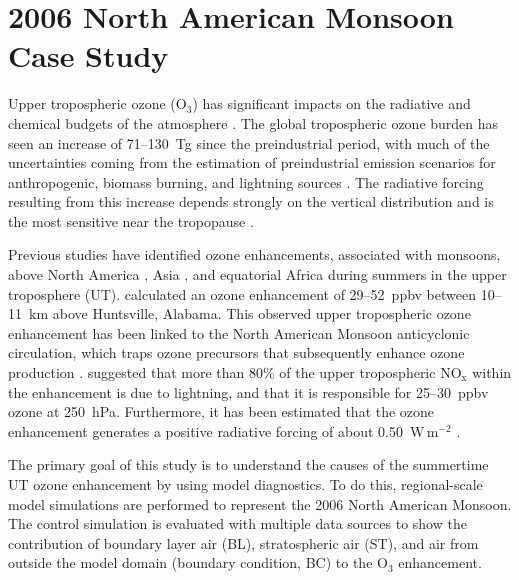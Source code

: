 \chapter{2006 North American Monsoon Case Study} \label{ch:2006}

\ifpdf
    \graphicspath{{Chapter_2006/figures/PNG/}{Chapter_2006/figures/PDF/}{Chapter_2006/}}
\else
    \graphicspath{{Chapter_2006/figures/EPS/}{Chapter_2006/}}
\fi

Upper tropospheric ozone (O$_3$) has significant impacts on the radiative and chemical budgets of
the atmosphere \citep{Kiehl:1999uq}. The global tropospheric ozone burden has seen an
increase of 71--130~Tg since the preindustrial period, with much of the uncertainties
coming from the estimation of preindustrial emission scenarios for anthropogenic, biomass
burning, and lightning sources \citep[][and references therein]{Lamarque:2005gb}. The
radiative forcing resulting from this increase depends strongly on the vertical distribution and
is the most sensitive near the tropopause \citep{Lacis:1990fk}.

Previous studies have identified ozone enhancements, associated with monsoons, above North America
\citep[][and references therein]{Li:2005ss,Cooper:2009nx}, Asia \citep{Park:2007bh,Worden:2009ve},
and equatorial Africa \citep{Bouarar:2011ly} during summers in the upper troposphere (UT).
\citet{Cooper:2007cr} calculated an ozone enhancement of 29--52~ppbv between 10--11~km
above Huntsville, Alabama. This observed upper tropospheric ozone enhancement has
been linked to the North American Monsoon anticyclonic circulation, which traps ozone
precursors that subsequently enhance ozone production \citep{Li:2005ss}. \citet{Cooper:2009nx}
suggested that more than 80\% of the upper tropospheric NO$_\mathrm{x}$ within the enhancement
is due to lightning, and that it is responsible for 25--30~ppbv ozone at 250~hPa. Furthermore,
it has been estimated that the ozone enhancement generates a positive radiative forcing of about
0.50~W\,m$^{-2}$ \citep{Cooper:2007cr,Choi:2009bh}.

The primary goal of this study is to understand the causes of the summertime UT ozone enhancement by
using model diagnostics. To do this, regional-scale model simulations are performed to represent
the 2006 North American Monsoon. The control simulation is evaluated with multiple data sources to
show the contribution of boundary layer air (BL), stratospheric air (ST), and air from outside the model
domain (boundary condition, BC) to the O$_3$ enhancement.

